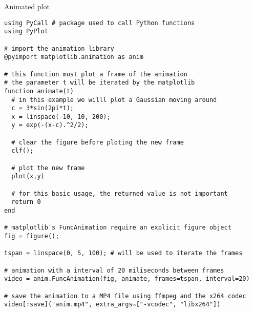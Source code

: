 \begin{example}{Animated plot}
\begin{verbatim}
using PyCall # package used to call Python functions
using PyPlot

# import the animation library
@pyimport matplotlib.animation as anim

# this function must plot a frame of the animation
# the parameter t will be iterated by the matplotlib
function animate(t)
  # in this example we willl plot a Gaussian moving around
  c = 3*sin(2pi*t);
  x = linspace(-10, 10, 200);
  y = exp(-(x-c).^2/2);

  # clear the figure before ploting the new frame
  clf(); 
  
  # plot the new frame
  plot(x,y)

  # for this basic usage, the returned value is not important
  return 0
end

# matplotlib's FuncAnimation require an explicit figure object
fig = figure();

tspan = linspace(0, 5, 100); # will be used to iterate the frames

# animation with a interval of 20 miliseconds between frames
video = anim.FuncAnimation(fig, animate, frames=tspan, interval=20)

# save the animation to a MP4 file using ffmpeg and the x264 codec
video[:save]("anim.mp4", extra_args=["-vcodec", "libx264"])
\end{verbatim}
\end{example}













